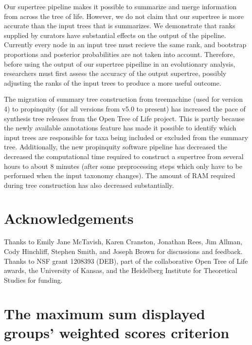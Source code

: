 \documentclass[fleqn,12pt,lineno,english]{wlpeerj}
\begin{document}
Our supertree pipeline makes it possible to summarize and merge
information from across the tree of life.  However, we do not claim
that our supertree is more accurate than the input trees that is
summarizes.  We demonstrate that ranks supplied by curators have
substantial effects on the output of the pipeline.  Currently every
node in an input tree must recieve the same rank, and bootstrap
proportions and posterior probabilities are not taken into account.
Therefore, before using the output of our supertree pipeiline in an
evolutionary analysis, researchers must first assess the accuracy of
the output supertree, possibly adjusting the ranks of the input trees
to produce a more useful outcome.

The migration of summary tree construction from treemachine (used for
version 4) to propinquity (for all versions from v5.0 to present) has
increased the pace of synthesis tree releases from the Open Tree of
Life project.  This is partly because the newly available annotations
feature has made it possible to identify which input trees are
responsible for taxa being included or excluded from the summary tree.
Additionally, the new propinquity software pipeline has decreased the decreased
the computational time required to construct a supertree from several
hours to about 8 minutes (after some preprocessing steps which only
have to be performed when the input taxonomy changes).  The amount of
RAM required during tree construction has also decreased substantially. 

\section{Acknowledgements}

Thanks to Emily Jane McTavish, Karen Cranston, Jonathan Rees, Jim Allman, Cody Hinchliff,
Stephen Smith, and Joseph Brown for discussions and feedback. Thanks
to NSF grant 1208393 (DEB), part of the collaborative Open Tree of
Life awards, the University of Kansas, and the Heidelberg Institute
for Theoretical Studies for funding.





\appendix

\section{The maximum sum displayed groups' weighted scores criterion}\label{sec:The-maximum-sum}
\end{document}
